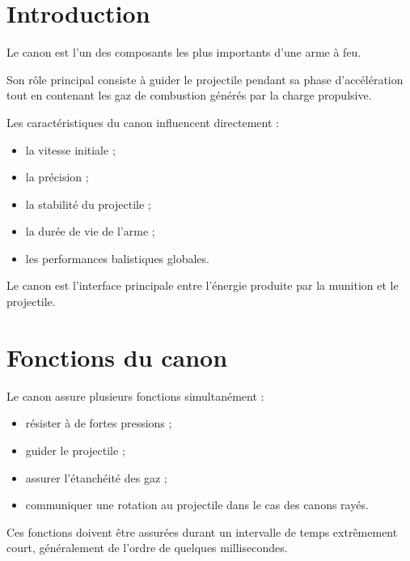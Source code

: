 
\section{Introduction}

Le canon est l'un des composants les plus importants d'une arme à feu.

Son rôle principal consiste à guider le projectile pendant sa phase
d'accélération tout en contenant les gaz de combustion générés par la charge
propulsive.

Les caractéristiques du canon influencent directement :

\begin{itemize}
    \item la vitesse initiale ;
    \item la précision ;
    \item la stabilité du projectile ;
    \item la durée de vie de l'arme ;
    \item les performances balistiques globales.
\end{itemize}

\begin{aretenir}

Le canon est l'interface principale entre l'énergie produite par la munition
et le projectile.

\end{aretenir}

\section{Fonctions du canon}

Le canon assure plusieurs fonctions simultanément :

\begin{itemize}
    \item résister à de fortes pressions ;
    \item guider le projectile ;
    \item assurer l'étanchéité des gaz ;
    \item communiquer une rotation au projectile dans le cas des canons rayés.
\end{itemize}

Ces fonctions doivent être assurées durant un intervalle de temps extrêmement
court, généralement de l'ordre de quelques millisecondes.

